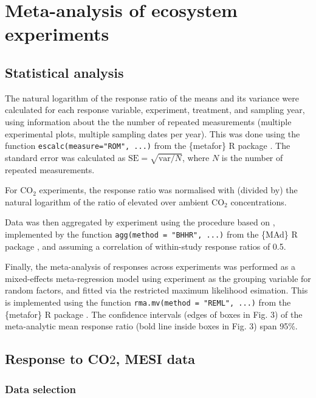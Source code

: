 \documentclass{myreport}
\begin{document}
\section{Meta-analysis of ecosystem experiments}

\subsection{Statistical analysis}
\label{sec:statisticalanalysis}

The natural logarithm of the response ratio of the means and its variance were calculated for each response variable, experiment, treatment, and sampling year, using information about the the number of repeated measurements (multiple experimental plots, multiple sampling dates per year). This was done using the function \texttt{escalc(measure="ROM", ...)} from the \{metafor\} R package \citep{viechtbauer_conducting_2010}. The standard error was calculated as $\text{SE} = \sqrt{\text{var}/N}$, where $N$ is the number of repeated measurements.

For CO$_2$ experiments, the response ratio was normalised with (divided by) the natural logarithm of the ratio of elevated over ambient CO$_2$ concentrations.

Data was then aggregated by experiment using the procedure based on \citet{borenstein_effect_2009}, implemented by the function \texttt{agg(method = "BHHR", ...)} from the \{MAd\} R package \citep{mad_r_package}, and assuming a correlation of within-study response ratios of 0.5.

Finally, the meta-analysis of responses across experiments was performed as a mixed-effects meta-regression model using experiment as the grouping variable for random factors, and fitted via the restricted maximum likelihood esimation. This is implemented using the function \texttt{rma.mv(method = "REML", ...)} from the \{metafor\} R package \citep{viechtbauer_conducting_2010}. The confidence intervals (edges of boxes in Fig. 3) of the meta-analytic mean response ratio (bold line inside boxes in Fig. 3) span 95\%.


\subsection{Response to CO$2$, MESI data}

\subsubsection{Data selection}
\end{document}
